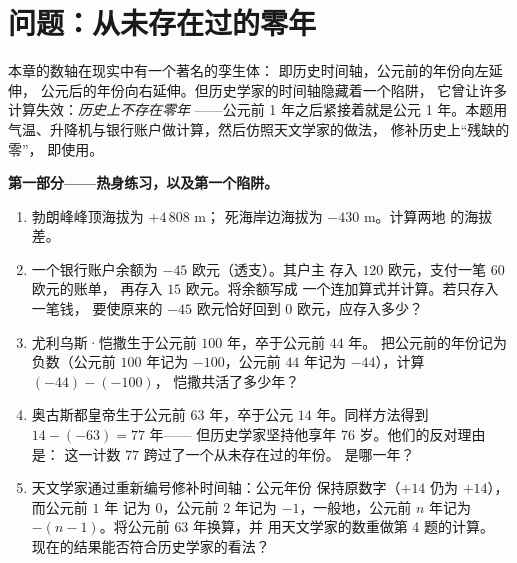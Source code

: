 \section{问题：从未存在过的零年}

\begin{problem}
\label{pb:g7:negatives:1}
本章的数轴在现实中有一个著名的孪生体：
即历史时间轴，公元前的年份向左延伸，
公元后的年份向右延伸。但历史学家的时间轴隐藏着一个陷阱，
它曾让许多计算失效：\emph{历史上不存在零年}
——公元前 1 年之后紧接着就是公元 1 年。本题用
气温、升降机与银行账户做计算，然后仿照天文学家的做法，
修补历史上“残缺的零”，
即使用。

\medskip
\noindent\textbf{第一部分——热身练习，以及第一个陷阱。}
\begin{enumerate}
  \item 勃朗峰峰顶海拔为 $+4\,808$ m；
        死海岸边海拔为 $-430$ m。计算两地
        的海拔差。
  \item 一个银行账户余额为 $-45$ 欧元（透支）。其户主
        存入 $120$ 欧元，支付一笔 $60$ 欧元的账单，
        再存入 $15$ 欧元。将余额写成
        一个连加算式并计算。若只存入一笔钱，
        要使原来的 $-45$ 欧元恰好回到
        $0$ 欧元，应存入多少？
  \item 尤利乌斯·恺撒生于公元前 $100$ 年，卒于公元前 $44$ 年。
        把公元前的年份记为负数（公元前 $100$ 年记为
        $-100$，公元前 $44$ 年记为 $-44$），计算 $(-44) - (-100)$，
        恺撒共活了多少年？
  \item 奥古斯都皇帝生于公元前 $63$ 年，卒于公元
        $14$ 年。同样方法得到 $14 - (-63) = 77$ 年——
        但历史学家坚持他享年 $76$ 岁。他们的反对理由是：
        这一计数 $77$ 跨过了一个从未存在过的年份。
        是哪一年？
  \item 天文学家通过重新编号修补时间轴：公元年份
        保持原数字（$+14$ 仍为 $+14$），而公元前 $1$ 年
        记为 $0$，公元前 $2$ 年记为 $-1$，一般地，公元前
        $n$ 年记为 $-(n - 1)$。将公元前 $63$ 年换算，并
        用天文学家的数重做第 4 题的计算。
        现在的结果能否符合历史学家的看法？
\end{enumerate}


\end{problem}
